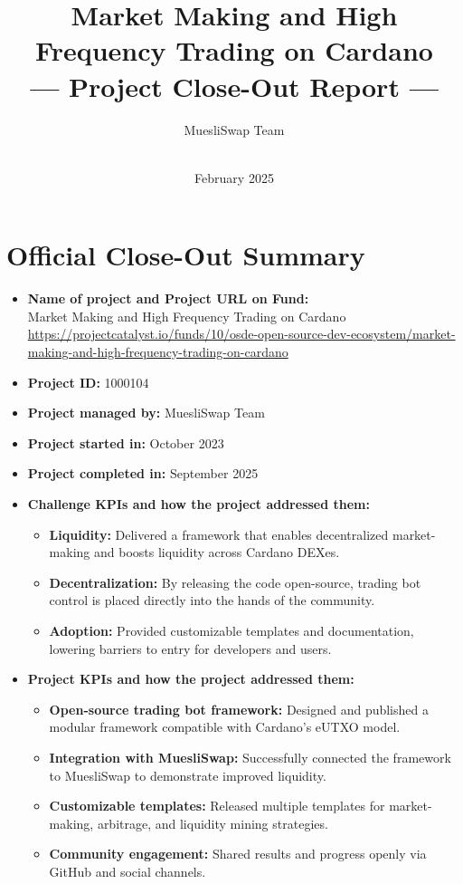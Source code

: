 \documentclass[11pt]{article}
\title{\textbf{Market Making and High Frequency Trading on Cardano \\--- Project Close-Out Report ---}}
\author{MuesliSwap Team}
\date{\\February 2025}
\begin{document}
\maketitle

\section*{Official Close-Out Summary}
\begin{itemize}[leftmargin=1cm]
    \item \textbf{Name of project and Project URL on Fund:}\\
    Market Making and High Frequency Trading on Cardano \\
    {\scriptsize\url{https://projectcatalyst.io/funds/10/osde-open-source-dev-ecosystem/market-making-and-high-frequency-trading-on-cardano}}

    \item \textbf{Project ID:} 1000104

    \item \textbf{Project managed by:} MuesliSwap Team

    \item \textbf{Project started in:} October 2023

    \item \textbf{Project completed in:} September 2025

    \item \textbf{Challenge KPIs and how the project addressed them:}
    \begin{itemize}
        \item \textbf{Liquidity:} Delivered a framework that enables decentralized market-making and boosts liquidity across Cardano DEXes.
        \item \textbf{Decentralization:} By releasing the code open-source, trading bot control is placed directly into the hands of the community.
        \item \textbf{Adoption:} Provided customizable templates and documentation, lowering barriers to entry for developers and users.
    \end{itemize}

    \item \textbf{Project KPIs and how the project addressed them:}
    \begin{itemize}
        \item \textbf{Open-source trading bot framework:} Designed and published a modular framework compatible with Cardano’s eUTXO model.
        \item \textbf{Integration with MuesliSwap:} Successfully connected the framework to MuesliSwap to demonstrate improved liquidity.
        \item \textbf{Customizable templates:} Released multiple templates for market-making, arbitrage, and liquidity mining strategies.
        \item \textbf{Community engagement:} Shared results and progress openly via GitHub and social channels.
    \end{itemize}


\end{itemize}
\end{document}
